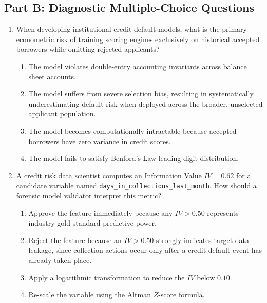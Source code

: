 \subsection*{Part B: Diagnostic Multiple-Choice Questions}

\begin{enumerate}[label=\textbf{MCQ 8.\arabic*}]
    \item When developing institutional credit default models, what is the primary econometric risk of training scoring engines exclusively on historical accepted borrowers while omitting rejected applicants?
    \begin{enumerate}[label=(\alph*)]
        \item The model violates double-entry accounting invariants across balance sheet accounts.
        \item The model suffers from severe selection bias, resulting in systematically underestimating default risk when deployed across the broader, unselected applicant population.
        \item The model becomes computationally intractable because accepted borrowers have zero variance in credit scores.
        \item The model fails to satisfy Benford's Law leading-digit distribution.
    \end{enumerate}

    \item A credit risk data scientist computes an Information Value $IV = 0.62$ for a candidate variable named \texttt{days\_in\_collections\_last\_month}. How should a forensic model validator interpret this metric?
    \begin{enumerate}[label=(\alph*)]
        \item Approve the feature immediately because any $IV > 0.50$ represents industry gold-standard predictive power.
        \item Reject the feature because an $IV > 0.50$ strongly indicates target data leakage, since collection actions occur only after a credit default event has already taken place.
        \item Apply a logarithmic transformation to reduce the $IV$ below $0.10$.
        \item Re-scale the variable using the Altman $Z$-score formula.
    \end{enumerate}
\end{enumerate}
